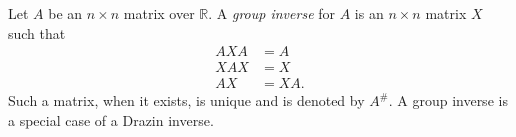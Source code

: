 \documentclass[12pt]{article}
\begin{document}
Let $A$ be an $n \times n$ matrix over $\mathbb{R}$. 
A \emph{group inverse} for $A$ is an $n \times n$ matrix
$X$ such that
\begin{align}
AXA &= A \\
XAX &= X \\
AX &= XA.
\end{align}
Such a matrix, when it exists, is unique and is denoted by $A^{\#}$.
A group inverse is a special case of a Drazin inverse.

\end{document}
